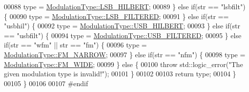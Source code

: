 \begin{DoxyCode}
00088             type = \hyperlink{namespaceradio_a46fb7299001138f28b7f69975c58399ea18f970daa5b5a8f72cbd45f7b49a6b6a}{ModulationType::LSB\_HILBERT};
00089         \} \textcolor{keywordflow}{else} \textcolor{keywordflow}{if}(str == \textcolor{stringliteral}{"lsbfilt"}) \{
00090             type = \hyperlink{namespaceradio_a46fb7299001138f28b7f69975c58399eaa6fd9ffa81c9d5e4a255b0c3b2336bd8}{ModulationType::LSB\_FILTERED};
00091         \} \textcolor{keywordflow}{else} \textcolor{keywordflow}{if}(str == \textcolor{stringliteral}{"usbhil"}) \{
00092             type = \hyperlink{namespaceradio_a46fb7299001138f28b7f69975c58399ea1b14284e455bf5c311de662665312d13}{ModulationType::USB\_HILBERT};
00093         \} \textcolor{keywordflow}{else} \textcolor{keywordflow}{if}(str == \textcolor{stringliteral}{"usbfilt"}) \{
00094             type = \hyperlink{namespaceradio_a46fb7299001138f28b7f69975c58399ea9d8eca0470206cddb0dd0297717eb876}{ModulationType::USB\_FILTERED};
00095         \} \textcolor{keywordflow}{else} \textcolor{keywordflow}{if}(str == \textcolor{stringliteral}{"wfm"} || str == \textcolor{stringliteral}{"fm"}) \{
00096             type = \hyperlink{namespaceradio_a46fb7299001138f28b7f69975c58399ea7b4b1e7876b8d9de5b77b9264fbe556a}{ModulationType::FM\_NARROW};
00097         \} \textcolor{keywordflow}{else} \textcolor{keywordflow}{if}(str == \textcolor{stringliteral}{"nfm"}) \{
00098             type = \hyperlink{namespaceradio_a46fb7299001138f28b7f69975c58399eafabee3b32b363b14950cb5f5b61e998c}{ModulationType::FM\_WIDE};
00099         \} \textcolor{keywordflow}{else} \{
00100             \textcolor{keywordflow}{throw} std::logic\_error(\textcolor{stringliteral}{"The given modulation type is invalid!"});
00101         \}
00102 
00103         \textcolor{keywordflow}{return} type;
00104     \}
00105 \}
00106 
00107 \textcolor{preprocessor}{#endif}
\end{DoxyCode}
